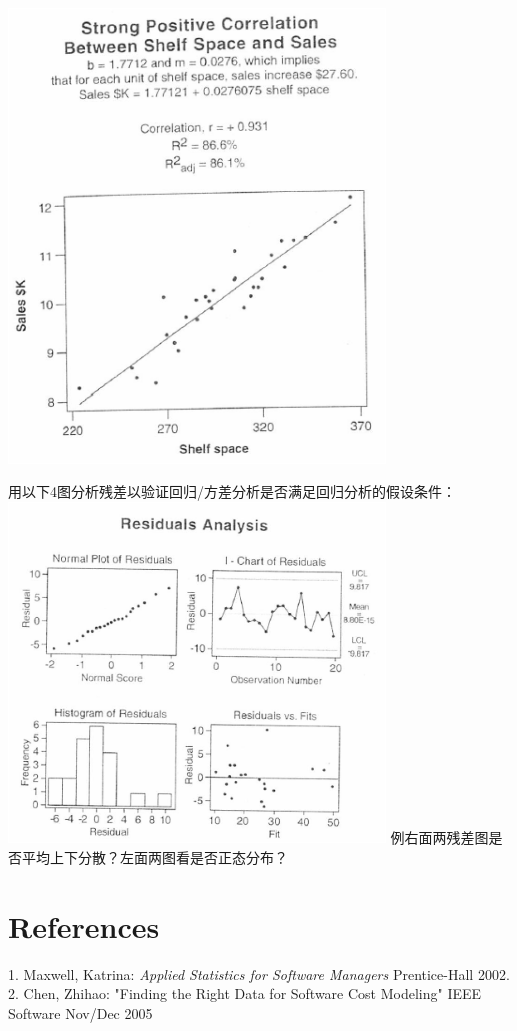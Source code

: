 \includegraphics[width=10cm]{相关性13.png}

用以下4图分析残差以验证回归/方差分析是否满足回归分析的假设条件：\\

\includegraphics[width=10cm]{相关性15.png}
例右面两残差图是否平均上下分散？左面两图看是否正态分布？

\hypertarget{references}{%
\section{References}\label{references}}

1. Maxwell, Katrina: \emph{Applied Statistics for Software Managers}
Prentice-Hall 2002.\\
2. Chen, Zhihao: "Finding the Right Data for Software Cost Modeling"
IEEE Software Nov/Dec 2005




